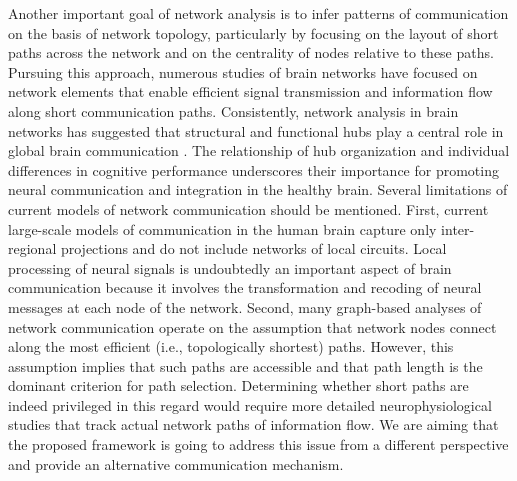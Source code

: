 \documentclass[9pt,twocolumn,twoside,lineno]{pnas-new}
\begin{document}
Another important goal of network analysis is to infer patterns of communication on the basis of network topology, particularly by focusing on the layout of short paths across the network and on the centrality of nodes relative to these paths. Pursuing this approach, numerous studies of brain networks have focused on network elements that enable efficient signal transmission and information flow along short communication paths. Consistently, network analysis in brain networks has suggested that structural and functional hubs play a central role in global brain communication \cite{structure-funct}. The relationship of hub organization and individual differences in cognitive performance \cite{intelll} underscores their importance for promoting neural communication and integration in the healthy brain. Several limitations of current models of network communication
should be mentioned. First, current large-scale models of communication in the human brain capture only inter-regional projections and do not include
networks of local circuits. Local processing of neural signals
is undoubtedly an important aspect of brain communication
because it involves the transformation and recoding of neural messages at each node of the network. Second, many graph-based analyses of network communication operate on the assumption that network nodes connect along the most efficient (i.e., topologically shortest) paths. However, this assumption implies that such paths are accessible and that path length is the dominant criterion for path selection. Determining whether short paths are indeed privileged in this regard would require more detailed neurophysiological studies that track actual network paths of information flow\cite{hubs}. We are aiming that the proposed framework is going to address this issue from a different perspective and provide an alternative communication mechanism.
\end{document}
